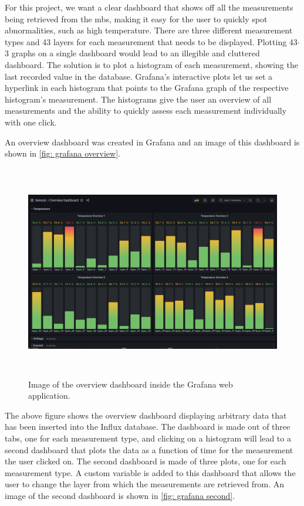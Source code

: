 \documentclass[main.tex]{subfiles}
\begin{document}
For this project, we want a clear dashboard that shows off all the measurements being retrieved from the \gls{mb}s, making it easy for the user to quickly spot abnormalities, such as high temperature. There are three different measurement types and 43 layers for each measurement that needs to be displayed. Plotting 43$\cdot$3 graphs on a single dashboard would lead to an illegible and cluttered dashboard. The solution is to plot a histogram of each measurement, showing the last recorded value in the database. Grafana's interactive plots let us set a hyperlink in each histogram that points to the Grafana graph of the respective histogram's measurement. The histograms give the user an overview of all measurements and the ability to quickly assess each measurement individually with one click.

An overview dashboard was created in Grafana and an image of this dashboard is shown in \autoref{fig: grafana overview}.

\begin{figure}[!ht]
    \centering
    \includegraphics[scale=0.4,height=9.4cm]{images/grafana_overview.png}
    \caption{Image of the overview dashboard inside the Grafana web application.}
    \label{fig: grafana overview}
\end{figure}
\FloatBarrier

The above figure shows the overview dashboard displaying arbitrary data that has been inserted into the Influx database. The dashboard is made out of three tabs, one for each measurement type, and clicking on a histogram will lead to a second dashboard that plots the data as a function of time for the measurement the user clicked on. The second dashboard is made of three plots, one for each measurement type. A custom variable is added to this dashboard that allows the user to change the layer from which the measurements are retrieved from. An image of the second dashboard is shown in \autoref{fig: grafana second}.
\end{document}

